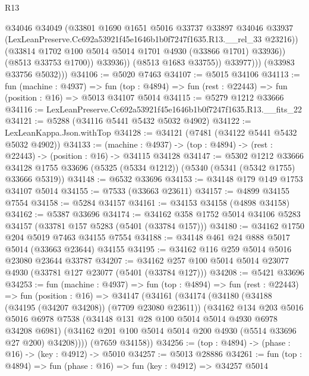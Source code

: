 \begin{lexlean}{R13}
\begin{coremodule}
                        @34046
                        @34049
                        (@33801
                          @1690
                          @1651
                          @5016
                          @33737
                          @33897
                          @34046
                          @33937
                          (LexLeanPreserve.Cc692a53921f45e1646b1b0f7247f1635.R13.__rel_33 @23216))
                        (@33814 @1702 @100 @5014 @5014 @1701 @4930 (@33866 @1701) @33936))
                      (@8513 @33753 @1700))
                    @33936))
                (@8513 @1683 @33755))
              @33977)))
        (@33983 @33756 @5032)))
@34106 := @5020 @7463
@34107 := @5015 @34106
@34113 := fun (machine : @4937) =>
  fun (top : @4894) => fun (rest : @22443) => fun (position : @16) => @5013 @34107 @5014
@34115 := @5279 @1212 @33666
@34116 := LexLeanPreserve.Cc692a53921f45e1646b1b0f7247f1635.R13.__fits_22
@34121 := @5288 (@34116 @5441 @5432 @5032 @4902)
@34122 := LexLeanKappa.Json.withTop
@34128 := @34121 (@7481 (@34122 @5441 @5432 @5032 @4902))
@34133 := (machine : @4937) -> (top : @4894) -> (rest : @22443) -> (position : @16) -> @34115 @34128
@34147 := @5302
    @1212
    @33666
    @34128
    @1755
    @33696
    (@5325 (@5334 @1212))
    (@5340 (@5341 (@5342 @1755) @33666 @5319))
@34148 := @6532 @33696
@34153 := @34148 @179 @149 @1753 @34107 @5014
@34155 := @7533 (@33663 @23611)
@34157 := @4899 @34155 @7554
@34158 := @5284 @34157
@34161 := @34153 @34158 (@4898 @34158)
@34162 := @5387 @33696
@34174 := @34162 @358 @1752 @5014 @34106 @5283 @34157 (@33781 @157 @5283 (@5401 (@33784 @157)))
@34180 := @34162 @1750 @204 @5019 @7463 @34155 @7554
@34188 := @34148 @461 @24 @888 @5017 @5014 (@33663 @23644) @34155
@34195 := @34162 @116 @259 @5014 @5016 @23080 @23644 @33787
@34207 := @34162 @257 @100 @5014 @5014 @23077 @4930 (@33781 @127 @23077 (@5401 (@33784 @127)))
@34208 := @5421 @33696
@34253 := fun (machine : @4937) =>
  fun (top : @4894) =>
  fun (rest : @22443) =>
  fun (position : @16) =>
  @34147
    (@34161
      (@34174
        (@34180
          (@34188 (@34195 (@34207 @34208)) (@7709 @23080 @23611))
          (@34162
            @134
            @203
            @5016
            @5016
            @6978
            @7538
            (@34148 @131 @28 @100 @5014 @5014 @4930 @6978 @34208 @6981)
            (@34162 @201 @100 @5014 @5014 @200 @4930 (@5514 @33696 @27 @200) @34208))))
      (@7659 @34158))
@34256 := (top : @4894) -> (phase : @16) -> (key : @4912) -> @5010
@34257 := @5013 @28886
@34261 := fun (top : @4894) => fun (phase : @16) => fun (key : @4912) => @34257 @5014

\end{coremodule}
\end{lexlean}
